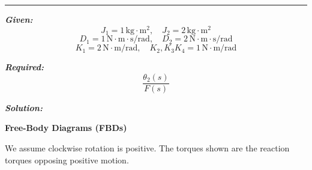 \documentclass[11pt]{article}
\begin{document}
\noindent\rule{\textwidth}{1pt}

\vspace{12pt}


\noindent\textbf{\textit{Given:}}
\[
J_1 = 1\, \text{kg}\cdot\text{m}^2, \quad J_2 = 2\, \text{kg}\cdot\text{m}^2
\]
\[
D_1 = 1\, \text{N}\cdot\text{m}\cdot\text{s/rad}, \quad D_2 = 2\, \text{N}\cdot\text{m}\cdot\text{s/rad}
\]
\[
K_1 = 2\, \text{N}\cdot\text{m/rad}, \quad K_2,K_3K_4 = 1\, \text{N}\cdot\text{m/rad}
\]


\vspace{1em}
\noindent

\noindent\textbf{\textit{Required:}}
\[
\frac{\theta_2(s)}{F(s)}
\]

\vspace{1.5em}
\noindent\textbf{\textit{Solution:}}

\vspace{8pt}

\noindent\textbf{Free-Body Diagrams (FBDs)}
\vspace{12pt}

We assume clockwise rotation is positive. The torques shown are the reaction torques opposing positive motion.
\end{document}
